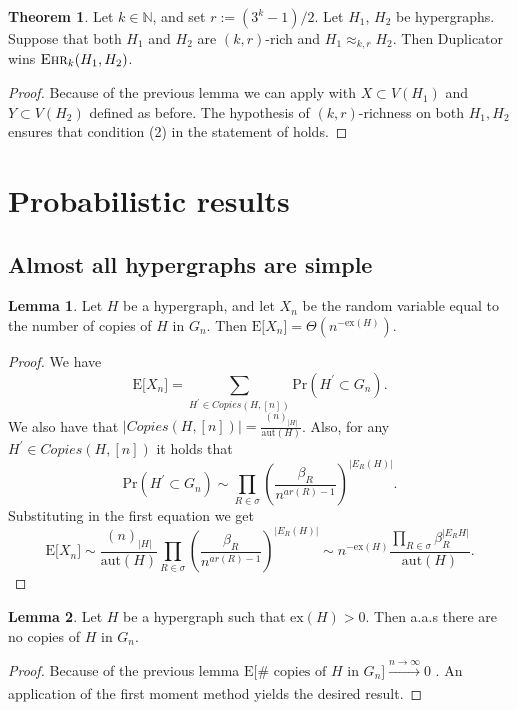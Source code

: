 \documentclass[12pt,notitlepage,a4paper]{article}
\theoremstyle{definition}
\newtheorem{theorem}{Theorem}[section]
\newtheorem{lemma}{Lemma}[section]
\newcommand{\N}{\mathbb{N}}
\newcommand{\ehr}{\textsc{Ehr}}
\newcommand{\PR}[1]{\mathrm{Pr}\left(#1\right)}
\newcommand{\sep}{\noindent\rule{2cm}{0.4pt}}
\newcommand{\aut}{\mathrm{aut}}
\newcommand{\ex}{\mathrm{ex}}
\begin{document}
\begin{theorem}\label{thm:Duplicatorwins}
	Let $k\in \N$, and set $r:=(3^k-1)/2$.
	Let $H_1$, $H_2$ be hypergraphs.
	Suppose
	that both $H_1$ and $H_2$ are $(k,r)$-rich and
	$H_1\approx_{k,r} H_2$. Then Duplicator wins $\ehr_{k}(H_1,H_2)$.
\end{theorem}
	\begin{proof}
		Because of the previous lemma we can apply 
		 with $X\subset V(H_1)$ 
		and	$Y\subset V(H_2)$ defined as before. The
		hypothesis of $(k,r)$-richness on both $H_1, H_2$ ensures that
		condition (2) in the statement of 
		holds. 
	\end{proof}


\section{Probabilistic results}



\subsection{Almost all hypergraphs are simple}

\begin{lemma}
	Let $H$ be a hypergraph, and let $X_n$ be the 
	random variable equal to the number of copies of $H$ in 
	$G_n$. Then 
	$\mathrm{E}\big[X_n\big]=\Theta(n^{-\ex(H)})$.  
\end{lemma}
\begin{proof}
We have
\[
 \mathrm{E}\big[X_n\big]=
 \sum_{H^\prime \in Copies(H,[n])} \PR{H^\prime \subset G_n}.
\]	
We also have that $\Big|Copies(H,[n])\Big|=\frac{(n)_{|H|}}{\aut(H)}$. Also, 
for any $H^\prime \in Copies(H,[n])$ it holds that
\[
\PR{H^\prime \subset G_n}\sim \prod_{R\in \sigma} \left(\frac{\beta_R}{n^{ar(R)-1}} 
\right)^{|E_R(H)|}.
\]
Substituting in the first equation we get
\[
\mathrm{E}\big[X_n\big]\sim 
\frac{(n)_{|H|}}{\aut(H)}
\prod_{R\in \sigma} \left(\frac{\beta_R}{n^{ar(R)-1}}\right)^{|E_R(H)|}
\sim
n^{-\ex(H)}  \frac{\prod_{R\in \sigma} \beta_R^{
|E_R{H}| }}{\aut(H)}.
\]	
\end{proof}


\begin{lemma} \label{lem:nocopiesdense}
	Let $H$ be a hypergraph such that $\ex(H)>0$. Then
	a.a.s there are no copies of $H$ in $G_n$. 
\end{lemma}  
\begin{proof}
	Because of the previous lemma
	$\mathrm{E}\big[\# \text{ copies of }H \text{ in } G_n\big] 
	\xrightarrow[]{n\to \infty} 0$ . An application of the first moment
	method yields the desired result. 
\end{proof} 
\end{document}
